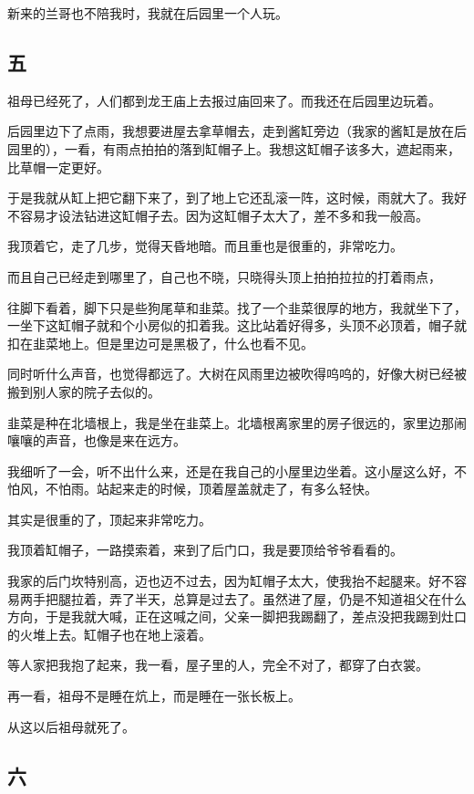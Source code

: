 \documentclass[UTF8]{ctexart}
\begin{document}
新来的兰哥也不陪我时，我就在后园里一个人玩。

\subsection{五}

祖母已经死了，人们都到龙王庙上去报过庙回来了。而我还在后园里边玩着。

后园里边下了点雨，我想要进屋去拿草帽去，走到酱缸旁边（我家的酱缸是放在后园里的），一看，有雨点拍拍的落到缸帽子上。我想这缸帽子该多大，遮起雨来，比草帽一定更好。

于是我就从缸上把它翻下来了，到了地上它还乱滚一阵，这时候，雨就大了。我好不容易才设法钻进这缸帽子去。因为这缸帽子太大了，差不多和我一般高。

我顶着它，走了几步，觉得天昏地暗。而且重也是很重的，非常吃力。

而且自己已经走到哪里了，自己也不晓，只晓得头顶上拍拍拉拉的打着雨点，

往脚下看着，脚下只是些狗尾草和韭菜。找了一个韭菜很厚的地方，我就坐下了，一坐下这缸帽子就和个小房似的扣着我。这比站着好得多，头顶不必顶着，帽子就扣在韭菜地上。但是里边可是黑极了，什么也看不见。

同时听什么声音，也觉得都远了。大树在风雨里边被吹得呜呜的，好像大树已经被搬到别人家的院子去似的。

韭菜是种在北墙根上，我是坐在韭菜上。北墙根离家里的房子很远的，家里边那闹嚷嚷的声音，也像是来在远方。

我细听了一会，听不出什么来，还是在我自己的小屋里边坐着。这小屋这么好，不怕风，不怕雨。站起来走的时候，顶着屋盖就走了，有多么轻快。

其实是很重的了，顶起来非常吃力。

我顶着缸帽子，一路摸索着，来到了后门口，我是要顶给爷爷看看的。

我家的后门坎特别高，迈也迈不过去，因为缸帽子太大，使我抬不起腿来。好不容易两手把腿拉着，弄了半天，总算是过去了。虽然进了屋，仍是不知道祖父在什么方向，于是我就大喊，正在这喊之间，父亲一脚把我踢翻了，差点没把我踢到灶口的火堆上去。缸帽子也在地上滚着。

等人家把我抱了起来，我一看，屋子里的人，完全不对了，都穿了白衣裳。

再一看，祖母不是睡在炕上，而是睡在一张长板上。

{从这以后祖母就死了}。

\subsection{六}
\end{document}
